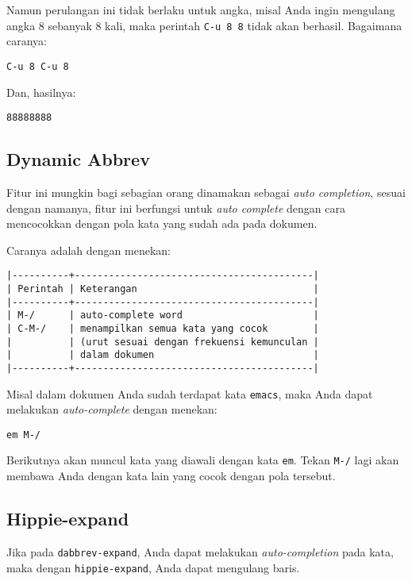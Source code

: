 \documentclass{article}
\begin{document}
Namun perulangan ini tidak berlaku untuk angka, misal Anda ingin mengulang
angka 8 sebanyak 8 kali, maka perintah \verb=C-u 8 8= tidak akan berhasil.
Bagaimana caranya:

\begin{verbatim}
C-u 8 C-u 8
\end{verbatim}

Dan, hasilnya:

\begin{verbatim}
88888888
\end{verbatim}

\subsection{Dynamic Abbrev}
Fitur ini mungkin bagi sebagian orang dinamakan sebagai \emph{auto completion},
sesuai dengan namanya, fitur ini berfungsi untuk \emph{auto complete} dengan 
cara mencocokkan dengan pola kata yang sudah ada pada dokumen.

Caranya adalah dengan menekan:

\begin{verbatim}
|----------+------------------------------------------|
| Perintah | Keterangan                               |
|----------+------------------------------------------|
| M-/      | auto-complete word                       |
| C-M-/    | menampilkan semua kata yang cocok        |
|          | (urut sesuai dengan frekuensi kemunculan |
|          | dalam dokumen                            |
|----------+------------------------------------------|
\end{verbatim}

Misal dalam dokumen Anda sudah terdapat kata \verb=emacs=, maka Anda dapat
melakukan \emph{auto-complete} dengan menekan:

\begin{verbatim}
em M-/
\end{verbatim}

Berikutnya akan muncul kata yang diawali dengan kata \verb=em=. Tekan 
\verb=M-/= lagi akan membawa Anda dengan kata lain yang cocok dengan pola
tersebut.

\subsection{Hippie-expand}
Jika pada \verb=dabbrev-expand=, Anda dapat melakukan \emph{auto-completion}
pada kata, maka dengan \verb=hippie-expand=, Anda dapat mengulang baris.
\end{document}
